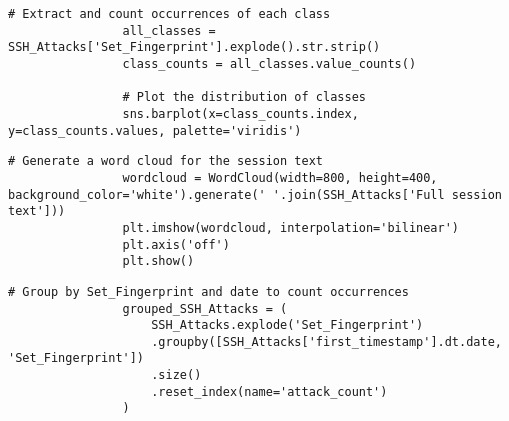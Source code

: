             \vspace{0.5em}

            \begin{lstlisting}[caption={Extract and visualize class distribution}, label={lst:extract-visualize-classes}]
                # Extract and count occurrences of each class
                all_classes = SSH_Attacks['Set_Fingerprint'].explode().str.strip()
                class_counts = all_classes.value_counts()

                # Plot the distribution of classes
                sns.barplot(x=class_counts.index, y=class_counts.values, palette='viridis')
            \end{lstlisting}
            
            \vspace{0.5em}

            \begin{lstlisting}[caption={Generate a word cloud from session text}, label={lst:generate-wordcloud}]
                # Generate a word cloud for the session text
                wordcloud = WordCloud(width=800, height=400, background_color='white').generate(' '.join(SSH_Attacks['Full session text']))
                plt.imshow(wordcloud, interpolation='bilinear')
                plt.axis('off')
                plt.show()
            \end{lstlisting}
            
            \vspace{0.5em}

            \begin{lstlisting}[caption={Group attacks by fingerprint and date}, label={lst:group-attacks}]
                # Group by Set_Fingerprint and date to count occurrences
                grouped_SSH_Attacks = (
                    SSH_Attacks.explode('Set_Fingerprint')
                    .groupby([SSH_Attacks['first_timestamp'].dt.date, 'Set_Fingerprint'])
                    .size()
                    .reset_index(name='attack_count')
                )
            \end{lstlisting}
            
            \vspace{0.5em}

